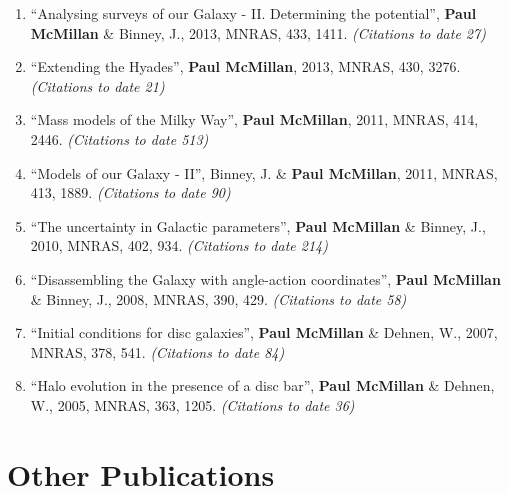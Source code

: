 \documentclass{resume}
\begin{document}
\begin{enumerate}
\item ``Analysing surveys of our Galaxy - II. Determining the potential'', \textbf{Paul McMillan} \& Binney, J., 2013, MNRAS, 433, 1411. \textit{(Citations to date 27)}

\item ``Extending the Hyades'', \textbf{Paul McMillan}, 2013, MNRAS, 430, 3276. \textit{(Citations to date 21)}

\item ``Mass models of the Milky Way'', \textbf{Paul McMillan}, 2011, MNRAS, 414, 2446. \textit{(Citations to date 513)}

\item ``Models of our Galaxy - II'', Binney, J. \& \textbf{Paul McMillan}, 2011, MNRAS, 413, 1889. \textit{(Citations to date 90)}

\item ``The uncertainty in Galactic parameters'', \textbf{Paul McMillan} \& Binney, J., 2010, MNRAS, 402, 934. \textit{(Citations to date 214)}

\item ``Disassembling the Galaxy with angle-action coordinates'', \textbf{Paul McMillan} \& Binney, J., 2008, MNRAS, 390, 429. \textit{(Citations to date 58)}

\item ``Initial conditions for disc galaxies'', \textbf{Paul McMillan} \& Dehnen, W., 2007, MNRAS, 378, 541. \textit{(Citations to date 84)}

\item ``Halo evolution in the presence of a disc bar'', \textbf{Paul McMillan} \& Dehnen, W., 2005, MNRAS, 363, 1205. \textit{(Citations to date 36)}

\end{enumerate}\section*{Other Publications}
\end{document}
